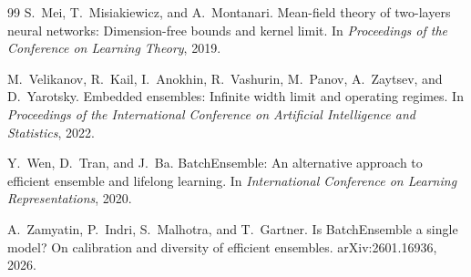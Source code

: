\documentclass{article}
\theoremstyle{definition}
\begin{document}
\begin{thebibliography}{99}
S.~Mei, T.~Misiakiewicz, and A.~Montanari.
\newblock Mean-field theory of two-layers neural networks: Dimension-free bounds and kernel limit.
\newblock In \emph{Proceedings of the Conference on Learning Theory}, 2019.

M.~Velikanov, R.~Kail, I.~Anokhin, R.~Vashurin, M.~Panov, A.~Zaytsev, and D.~Yarotsky.
\newblock Embedded ensembles: Infinite width limit and operating regimes.
\newblock In \emph{Proceedings of the International Conference on Artificial Intelligence and Statistics}, 2022.

Y.~Wen, D.~Tran, and J.~Ba.
\newblock BatchEnsemble: An alternative approach to efficient ensemble and lifelong learning.
\newblock In \emph{International Conference on Learning Representations}, 2020.

A.~Zamyatin, P.~Indri, S.~Malhotra, and T.~Gartner.
\newblock Is BatchEnsemble a single model? On calibration and diversity of efficient ensembles.
\newblock arXiv:2601.16936, 2026.

\end{thebibliography}
\end{document}
